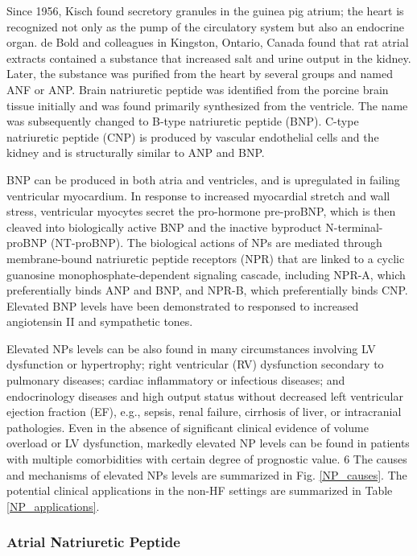 \documentclass[14pt,a4paper,onecolumn]{article}
\begin{document}
Since 1956, Kisch found secretory granules in the guinea pig atrium; the heart is recognized not only as the pump of the circulatory system but also an endocrine organ.\citep{Kisch1956} \citep{deBold1979} de Bold and colleagues in Kingston, Ontario, Canada found that rat atrial extracts contained a substance that increased salt and urine output in the kidney.\citep{deBold1981} Later, the substance was purified from the heart by several groups and named ANF or ANP.\citep{deBold1985}  Brain natriuretic peptide was identified from the porcine brain tissue initially and was found primarily synthesized from the ventricle. The name was subsequently changed to B-type natriuretic peptide (BNP). C-type natriuretic peptide (CNP) is produced by vascular endothelial cells and the kidney and is structurally similar to ANP and BNP.

BNP can be produced in both atria and ventricles, and is upregulated in failing ventricular myocardium. In response to increased myocardial stretch and wall stress, ventricular myocytes secret the pro-hormone pre-proBNP, which is then cleaved into biologically active BNP and the inactive byproduct N-terminal-proBNP (NT-proBNP). The biological actions of NPs are mediated through membrane-bound natriuretic peptide receptors (NPR) that are linked to a cyclic guanosine monophosphate-dependent signaling cascade, including NPR-A, which preferentially binds ANP and BNP, and NPR-B, which preferentially binds CNP. Elevated BNP levels have been demonstrated to responsed to increased angiotensin II and sympathetic tones. \citep{Iwanaga2006}

Elevated NPs levels can be also found in many circumstances involving LV dysfunction or hypertrophy; right ventricular (RV) dysfunction secondary to pulmonary diseases; cardiac inflammatory or infectious diseases; and endocrinology diseases and high output status without decreased left ventricular ejection fraction (EF), e.g., sepsis, renal failure, cirrhosis of liver, or intracranial pathologies. Even in the absence of significant clinical evidence of volume overload or LV dysfunction, markedly elevated NP levels can be found in patients with multiple comorbidities with certain degree of prognostic value. 6 The causes and mechanisms of elevated NPs levels are summarized in Fig. \ref{NP_causes}. The potential clinical applications in the non-HF settings are summarized in Table \ref{NP_applications}.

\subsubsection{Atrial Natriuretic Peptide}
\end{document}
